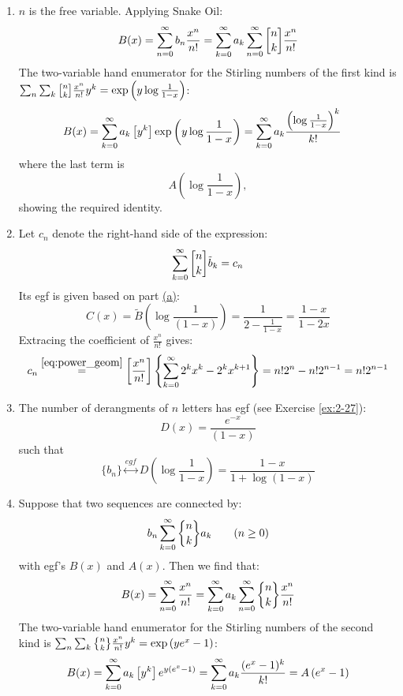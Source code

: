 \begin{solution}
    \begin{enumerate}[label=(\alph*)]
        \item \hypertarget{eq:ch4:12:a}{} $n$ is the free variable.
        Applying Snake Oil:
        \[
            B(x) = \bsum b_n \frac{x^n}{n!} =\bsum[k] a_k \bsum \stirlingFst{n}{k}  \frac{x^n}{n!}
        \]
        The two-variable hand enumerator for the Stirling numbers of the first kind is $\sum_n \sum_k \stirlingFst{n}{k} \frac{x^n}{n!}y^k = \exp\left(y\log\frac{1}{1-x}\right)$:
        \begin{align*}
            B(x) &= \bsum[k] a_k \coeff{y^k} \exp\left(y\log\frac{1}{1-x}\right) = \bsum[k] a_k \frac{\left(\log\frac{1}{1-x}\right)^k}{k!} 
        \end{align*}
        where the last term is 
        \[
            A\left(\log\frac{1}{1-x}\right),
        \]
        showing the required identity.
        \item Let $c_n$ denote the right-hand side of the expression:
        \[
            \bsum[k] \stirlingFst{n}{k}\tilde{b}_k = c_n
        \]
        Its egf is given based on part \hyperlink{eq:ch4:12:a}{(a)}:
        \[
            C(x) = \tilde{B}\left(\log\frac{1}{(1-x)}\right) = \frac{1}{2 - \frac{1}{1-x}} = \frac{1-x}{1-2x}
        \]
        Extracing the coefficient of $\frac{x^n}{n!}$ gives:
        \[
            c_n \estep{\eqref{eq:power_geom}} \coeff{\frac{x^n}{n!}} \left\{ \bsum[k] 2^kx^k - 2^kx^{k+1}\right\} = n!2^n - n!2^{n-1} = n!2^{n-1}
        \]
        \item The number of derangments of $n$ letters has egf (see Exercise \ref{ex:2-27}):
        \[
            D(x) = \frac{e^{-x}}{(1-x)}
        \]
        such that
        \[
            \{b_n\} \stackrel{egf}{\longleftrightarrow} D\left(\log\frac{1}{1-x}\right) = \frac{1-x}{1+\log(1-x)}
        \]
        \item Suppose that two sequences are connected by:
        \[
            b_n \bsum[k] \stirlingSnd{n}{k}a_k \qquad (n\geq 0)
        \]
        with egf's $B(x)$ and $A(x)$. Then we find that:
        \[
            B(x) = \bsum\frac{x^n}{n!} =  \bsum[k]  a_k \bsum\stirlingSnd{n}{k} \frac{x^n}{n!}
        \]
        The two-variable hand enumerator for the Stirling numbers of the second kind is $\sum_n \sum_k \stirlingSnd{n}{k} \frac{x^n}{n!}y^k = \exp\left(ye^{x}-1\right)$:
        \[
            B(x) = \bsum[k]  a_k \coeff{y^k} e^{y(e^{x}-1)} = \bsum[k] a_k \frac{(e^x-1)^k}{k!} = A\left(e^x-1\right)
\]
\end{enumerate}
\end{solution}
